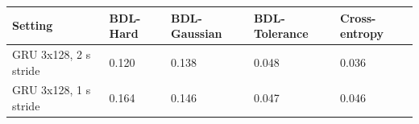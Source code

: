 \begin{tabular}{lllll}
\toprule
Setting & BDL-Hard & BDL-Gaussian & BDL-Tolerance & Cross-entropy \\
\midrule
GRU 3x128, 2 s stride & 0.120 & 0.138 & 0.048 & 0.036 \\
GRU 3x128, 1 s stride & 0.164 & 0.146 & 0.047 & 0.046 \\
\bottomrule
\end{tabular}
